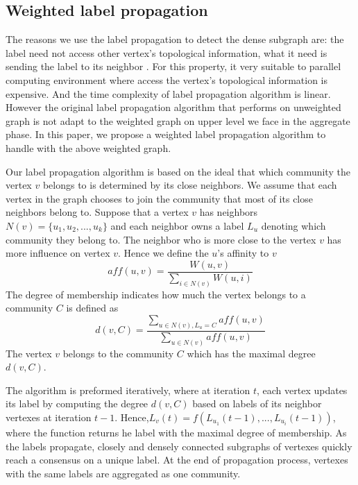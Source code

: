 \documentclass{acm_proc_article-sp}
\begin{document}
\subsection{Weighted label propagation}
The reasons we use the label propagation to detect the dense subgraph are: the label need not access other vertex's topological information, what it need is sending the label to its neighbor \cite{Raghavan2007Near}. For this property, it very suitable to parallel computing environment where access the vertex's topological information is expensive. And the time complexity of label propagation algorithm is linear. However the original label propagation algorithm that performs on unweighted graph is not adapt to the weighted graph on upper level we face in the aggregate phase. In this paper, we propose a weighted label propagation algorithm to handle with the above weighted graph.
\par
Our label propagation algorithm is based on the ideal that which community the vertex $v$ belongs to is determined by its close neighbors. We assume that each vertex in the graph chooses to join the community that most of its close neighbors belong to. Suppose that a vertex $v$ has neighbors $N(v)=\{u_{1},u_{2},...,u_{k}\}$ and each neighbor owns a label $L_{u}$ denoting which community they belong to. The neighbor who is more close to the vertex $v$ has more influence on vertex $v$. Hence we define the $u$'s affinity to $v$
\begin{displaymath}
aff(u,v)=\frac{W(u,v)}{\sum_{i\in N(v)}W(u,i)}
\end{displaymath}
The degree of membership indicates how much the vertex belongs to a community $C$ is defined as
\begin{displaymath}
d(v,C)=\frac{\sum_{u\in N(v),L_{u}=C}aff(u,v)}{\sum_{u\in N(v)}aff(u,v)}
\end{displaymath}
The vertex $v$ belongs to the community $C$ which has the maximal degree $d(v,C)$.
\par
The algorithm is preformed iteratively, where at iteration $t$, each vertex updates its label by computing the degree $d(v,C)$ based on labels of its neighbor vertexes at iteration $t-1$. Hence,$L_{v}(t)=f(L_{u_{1}}(t-1),...,L_{u_{i}}(t-1))$, where the function returns he label with the maximal degree of membership. As the labels propagate, closely and densely connected subgraphs of vertexes quickly reach a consensus on a unique label. At the end of propagation process, vertexes with the same labels are aggregated as one community.
\par
\end{document}
